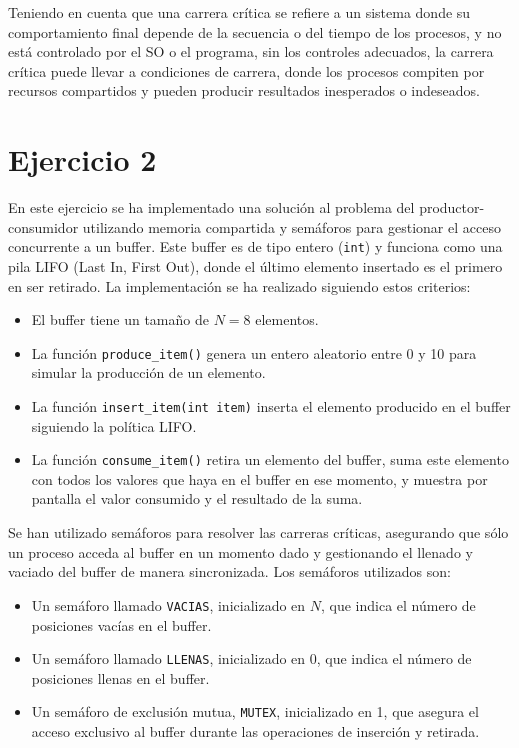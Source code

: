 \documentclass[twocolumn]{article}
\begin{document}
Teniendo en cuenta que una carrera crítica se refiere a un sistema donde su comportamiento final depende de la secuencia o del tiempo de los procesos, y no está controlado por el SO o el programa, sin los controles adecuados, la carrera crítica puede llevar a condiciones de carrera, donde los procesos compiten por recursos compartidos y pueden producir resultados inesperados o indeseados.

\section{Ejercicio 2}

En este ejercicio se ha implementado una solución al problema del productor-consumidor utilizando memoria compartida y semáforos para gestionar el acceso concurrente a un buffer. Este buffer es de tipo entero (\texttt{int}) y funciona como una pila LIFO (Last In, First Out), donde el último elemento insertado es el primero en ser retirado. La implementación se ha realizado siguiendo estos criterios:

\begin{itemize}
    \item El buffer tiene un tamaño de $N=8$ elementos.
    \item La función \texttt{produce\_item()} genera un entero aleatorio entre 0 y 10 para simular la producción de un elemento.
    \item La función \texttt{insert\_item(int item)} inserta el elemento producido en el buffer siguiendo la política LIFO.
    \item La función \texttt{consume\_item()} retira un elemento del buffer, suma este elemento con todos los valores que haya en el buffer en ese momento, y muestra por pantalla el valor consumido y el resultado de la suma.
\end{itemize}

Se han utilizado semáforos para resolver las carreras críticas, asegurando que sólo un proceso acceda al buffer en un momento dado y gestionando el llenado y vaciado del buffer de manera sincronizada. Los semáforos utilizados son:

\begin{itemize}
    \item Un semáforo llamado \texttt{VACIAS}, inicializado en $N$, que indica el número de posiciones vacías en el buffer.
    \item Un semáforo llamado \texttt{LLENAS}, inicializado en 0, que indica el número de posiciones llenas en el buffer.
    \item Un semáforo de exclusión mutua, \texttt{MUTEX}, inicializado en 1, que asegura el acceso exclusivo al buffer durante las operaciones de inserción y retirada.
\end{itemize}
\end{document}
